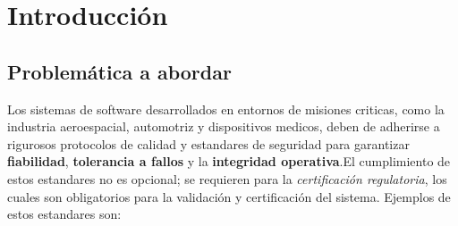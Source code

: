 \chapter{Introducción}


\section{Problemática a abordar}
\label{S:planteamiento de problema}

Los sistemas de software desarrollados en entornos de misiones criticas, como la industria aeroespacial, automotriz y dispositivos medicos, deben de adherirse a rigurosos protocolos de calidad y estandares de seguridad para garantizar \textbf{fiabilidad}, \textbf{tolerancia a fallos} y la \textbf{integridad operativa}.El cumplimiento de estos estandares no es opcional; se requieren para la \textit{certificación regulatoria}, los cuales son obligatorios para la validación y certificación del sistema. Ejemplos de estos estandares son: 



